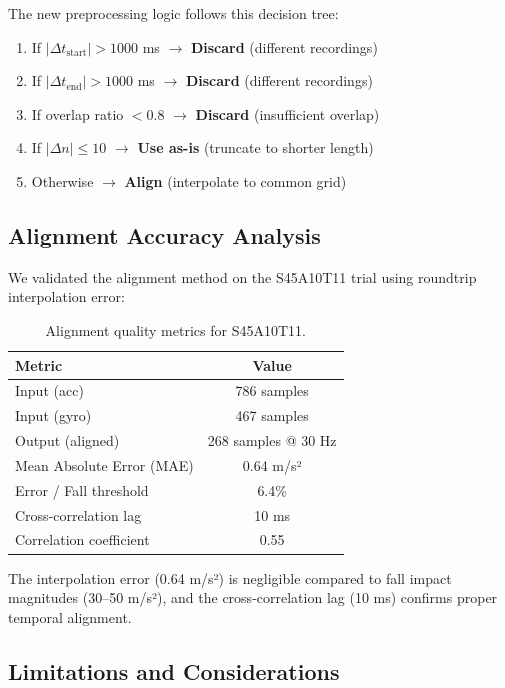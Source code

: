 The new preprocessing logic follows this decision tree:
\begin{enumerate}
    \item If $|\Delta t_{\text{start}}| > 1000$ ms $\rightarrow$ \textbf{Discard} (different recordings)
    \item If $|\Delta t_{\text{end}}| > 1000$ ms $\rightarrow$ \textbf{Discard} (different recordings)
    \item If overlap ratio $< 0.8$ $\rightarrow$ \textbf{Discard} (insufficient overlap)
    \item If $|\Delta n| \leq 10$ $\rightarrow$ \textbf{Use as-is} (truncate to shorter length)
    \item Otherwise $\rightarrow$ \textbf{Align} (interpolate to common grid)
\end{enumerate}

\subsection{Alignment Accuracy Analysis}

We validated the alignment method on the S45A10T11 trial using roundtrip interpolation error:

\begin{table}[h]
    \centering
    \caption{Alignment quality metrics for S45A10T11.}
    \label{tab:alignment_quality}
    \begin{tabular}{lc}
        \toprule
        Metric & Value \\
        \midrule
        Input (acc) & 786 samples \\
        Input (gyro) & 467 samples \\
        Output (aligned) & 268 samples @ 30 Hz \\
        \midrule
        Mean Absolute Error (MAE) & 0.64 m/s² \\
        Error / Fall threshold & 6.4\% \\
        Cross-correlation lag & 10 ms \\
        Correlation coefficient & 0.55 \\
        \bottomrule
    \end{tabular}
\end{table}

The interpolation error (0.64 m/s²) is negligible compared to fall impact magnitudes (30--50 m/s²), and the cross-correlation lag (10 ms) confirms proper temporal alignment.

\subsection{Limitations and Considerations}

